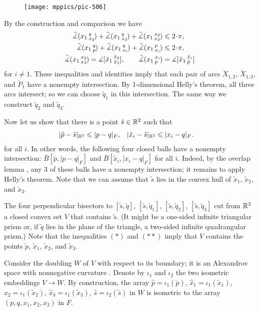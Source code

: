 \documentclass{article}
\begin{document}
\begin{wrapfigure}[5]{r}{30mm}
\vskip-2mm
\centering
\texttt{[image: mppics/pic-506]}
\end{wrapfigure}

By the construction and comparison we have 
\begin{align*}
\angk{x_1}{q}{x_2}+\angk{x_1}{q}{x_3}+\angk{x_1}{x_2}{x_3}&\le 2\cdot\pi,
\\
\angk{x_1}{q}{p}+\angk{x_1}{q}{x_i}+\angk{x_1}{p}{x_i}&\le 2\cdot\pi,
\\
\angk{x_1}{x_2}{x_3}=\measuredangle\hinge{\tilde x_1}{\tilde x_2}{\tilde x_3},
\qquad
\angk{x_1}{x_i}{p}&=\measuredangle\hinge{\tilde x_1}{\tilde x_i}{\tilde p}
\end{align*}
for $i\ne 1$.
These inequalities and identities imply that each pair of arcs $\breve{X}_{1,2}$, $\breve{X}_{1,3}$, and $\breve{P}_{1}$ have a nonempty intersection.
By 1-dimensional Helly's theorem, all three arcs intersect;
so we can choose $\tilde q_1$ in this intersection.
The same way we construct $\tilde q_2$ and $\tilde q_3$.

Now let us show that there is a point $\tilde s\in\mathbb{R}^2$ such that
\begin{align*}
|\tilde p-\tilde s|_{\mathbb{R}^3}&\leqslant|p-q|_F,
&
|\tilde x_i-\tilde s|_{\mathbb{R}^3}&\leqslant|x_i-q|_F.
\end{align*}
for all $i$.
In other words, the following four closed balls have a nonempty intersection: 
$\bar B[\tilde p,|p-q|_F]$ and
$\bar B[\tilde x_i,|x_i-q|_F]$ for all $i$.
Indeed, by the overlap lemma \cite{alexander2019alexandrov}, any 3 of these balls have a nonempty intersection;
it remains to apply Helly's theorem.
Note that we can assume that $\tilde s$ lies in the convex hull of $\tilde x_1$, $\tilde x_2$, and $\tilde x_3$.

The four perpendicular bisectors to 
$[\tilde s, \tilde q]$, 
$[\tilde s, \tilde q_1]$, 
$[\tilde s, \tilde q_2]$, 
$[\tilde s, \tilde q_3]$ cut from $\mathbb{R}^3$ a closed convex set $V$ that contains $\tilde s$.
(It might be a one-sided infinite triangular prism or, if $\tilde q$ lies in the plane of the triangle, a two-sided infinite quadrangular prism.)
Note that the inequalities $({*})$ and $({*}{*})$ imply that $V$ contains the points $\tilde p$, $\tilde x_1$, $\tilde x_2$, and $\tilde x_3$.

Consider the doubling $W$ of $V$ with respect to its boundary;
it is an Alexandrov space with nonnegative curvature \cite[5.2]{perelman:spaces2}.
Denote by $\iota_1$ and $\iota_2$ the two isometric embeddings $V\to W$.
By construction, the array $\hat p=\iota_1(\tilde p)$, $\hat x_1=\iota_1(\tilde x_1)$, $\hat x_2=\iota_1(\tilde x_2)$, $\hat x_3=\iota_1(\tilde x_3)$,  $\hat s=\iota_2(\tilde s)$ in $W$ is isometric to the array $(p, q, x_1, x_2, x_3)$ in $F$.
\end{document}
